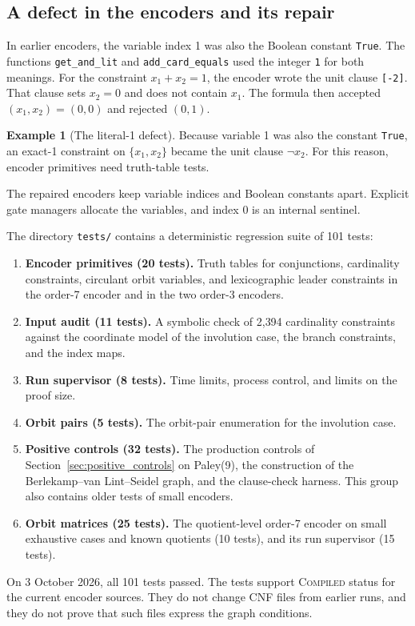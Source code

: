 \documentclass{article}
\theoremstyle{plain}
\theoremstyle{definition}
\newtheorem{example}[theorem]{Example}
\numberwithin{equation}{section}
\begin{document}
\subsection{A defect in the encoders and its repair}

In earlier encoders, the variable index 1 was also the Boolean constant \texttt{True}.
The functions \texttt{get\_and\_lit} and \texttt{add\_card\_equals} used the integer \texttt{1} for both meanings.
For the constraint $x_1 + x_2 = 1$, the encoder wrote the unit clause \texttt{[-2]}.
That clause sets $x_2 = 0$ and does not contain $x_1$.
The formula then accepted $(x_1, x_2) = (0, 0)$ and rejected $(0, 1)$.
\begin{example}[The literal-1 defect]
\label{ex:literal1}
Because variable 1 was also the constant \texttt{True}, an exact-1 constraint on $\{x_1, x_2\}$ became the unit clause $\neg x_2$. For this reason, encoder primitives need truth-table tests.
\end{example}
The repaired encoders keep variable indices and Boolean constants apart. Explicit gate managers allocate the variables, and index 0 is an internal sentinel.

The directory \texttt{tests/} contains a deterministic regression suite of 101 tests:
\begin{enumerate}
 \item \textbf{Encoder primitives (20 tests).} Truth tables for conjunctions, cardinality constraints, circulant orbit variables, and lexicographic leader constraints in the order-7 encoder and in the two order-3 encoders.
 \item \textbf{Input audit (11 tests).} A symbolic check of 2{,}394 cardinality constraints against the coordinate model of the involution case, the branch constraints, and the index maps.
 \item \textbf{Run supervisor (8 tests).} Time limits, process control, and limits on the proof size.
 \item \textbf{Orbit pairs (5 tests).} The orbit-pair enumeration for the involution case.
 \item \textbf{Positive controls (32 tests).} The production controls of Section~\ref{sec:positive_controls} on Paley(9), the construction of the Berlekamp--van Lint--Seidel graph, and the clause-check harness. This group also contains older tests of small encoders.
 \item \textbf{Orbit matrices (25 tests).} The quotient-level order-7 encoder on small exhaustive cases and known quotients (10 tests), and its run supervisor (15 tests).
\end{enumerate}
On 3 October 2026, all 101 tests passed. The tests support \textsc{Compiled} status for the current encoder sources. They do not change CNF files from earlier runs, and they do not prove that such files express the graph conditions.
\end{document}
